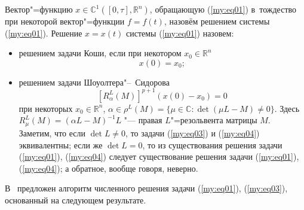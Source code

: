 Вектор"=функцию $x\in{\mathbb C}^{1} \left(\left[0,\tau\right], {\mathbb R}^{n}\right)$, обращающую (\ref{my:eq01}) в~тождество
при некоторой вектор"=функции $f=f(t)$, назовём решением системы (\ref{my:eq01}). 
Решение $x=x(t)$ системы (\ref{my:eq01}) назовем:
\begin{itemize}
\item[(i)] решением задачи Коши, если при некотором $x_{0}\in{\mathbb R}^{n}$
\begin{equation}
\label{my:eq03}
x(0)=x_0;
\end{equation}

\item[(ii)] решением задачи Шоуолтера"--~Сидорова
\begin{equation}
\label{my:eq04}
\left[ R^{L}_{\alpha}(M)\right]^{p+1} \left(x(0)-x_{0}\right)=0
\end{equation}
при некоторых $x_{0}\in{\mathbb R}^{n}$,
$\alpha\in\rho^{L}(M)=\{\mu\in{\mathbb C}:\det\left(\mu L-M\right)\neq 0\}$.
Здесь $R^{L}_{\mu}(M)= \left(\alpha L-M\right)^{-1}L$ "--- правая  $L$"=резольвента
матрицы $M$. Заметим, что если $\det L\neq 0$, то задачи (\ref{my:eq03}) и (\ref{my:eq04}) эквивалентны; если же \mbox{$\det L=0$}, то из
существования решения задачи (\ref{my:eq01}), (\ref{my:eq04}) следует существование решения задачи (\ref{my:eq01}), (\ref{my:eq04}); а обратное, вообще
говоря, неверно.

\end{itemize}

В~\cite{SvirBr, SvirBur} предложен алгоритм численного решения задачи (\ref{my:eq01}), (\ref{my:eq03}), основанный на следующем результате.
\smallskip

\hypertarget{svir:th:1}{}

